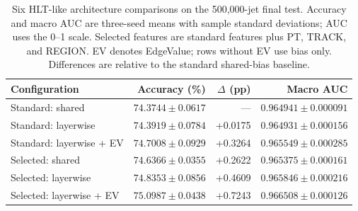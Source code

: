 \begin{table}[htbp]
\centering
\footnotesize
\setlength{\tabcolsep}{4pt}
\begin{tabularx}{\linewidth}{@{}Xrrr@{}}
\toprule
Configuration & Accuracy (\%) & $\Delta$ (pp) & Macro AUC \\
\midrule
Standard: shared & $74.3744 \pm 0.0617$ & --- & $0.964941 \pm 0.000091$ \\ %
Standard: layerwise & $74.3919 \pm 0.0784$ & +0.0175 & $0.964931 \pm 0.000156$ \\ %
Standard: layerwise + EV & $74.7008 \pm 0.0929$ & +0.3264 & $0.965549 \pm 0.000285$ \\ %
Selected: shared & $74.6366 \pm 0.0355$ & +0.2622 & $0.965375 \pm 0.000161$ \\ %
Selected: layerwise & $74.8353 \pm 0.0856$ & +0.4609 & $0.965846 \pm 0.000216$ \\ %
Selected: layerwise + EV & $75.0987 \pm 0.0438$ & +0.7243 & $0.966508 \pm 0.000126$ \\ %
\bottomrule
\end{tabularx}
\caption{Six HLT-like architecture comparisons on the 500,000-jet final test.
Accuracy and macro AUC are three-seed means with sample standard deviations;
AUC uses the 0--1 scale. Selected features are standard features plus PT,
TRACK, and REGION. EV denotes EdgeValue; rows without EV use bias only.
Differences are relative to the standard shared-bias baseline.}
\label{tab:hlt-architecture-results}
\end{table}
